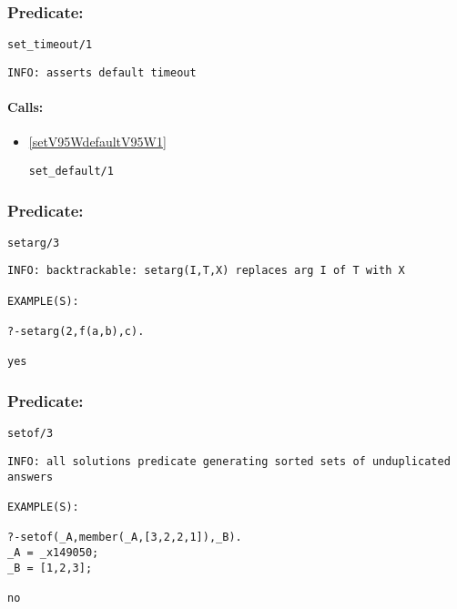 \subsubsection{Predicate:} \label{setV95WtimeoutV95W1}

\begin{verbatim}
set_timeout/1
\end{verbatim}

{\small \begin{verbatim}
INFO: asserts default timeout

\end{verbatim}}
\paragraph{Calls:} 
\begin{itemize}
\item \ref{setV95WdefaultV95W1} 
\begin{verbatim}
set_default/1
\end{verbatim}

\end{itemize}

\subsubsection{Predicate:} \label{setargV95W3}

\begin{verbatim}
setarg/3
\end{verbatim}

{\small \begin{verbatim}
INFO: backtrackable: setarg(I,T,X) replaces arg I of T with X

EXAMPLE(S):

?-setarg(2,f(a,b),c).

yes

\end{verbatim}}

\subsubsection{Predicate:} \label{setofV95W3}

\begin{verbatim}
setof/3
\end{verbatim}

{\small \begin{verbatim}
INFO: all solutions predicate generating sorted sets of unduplicated answers

EXAMPLE(S):

?-setof(_A,member(_A,[3,2,2,1]),_B).
_A = _x149050;
_B = [1,2,3];

no

\end{verbatim}}
